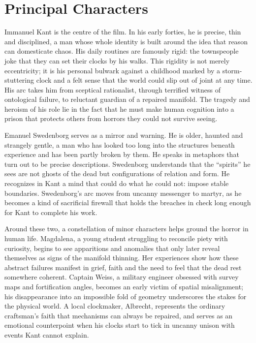 \documentclass[12pt]{article}
\begin{document}
\section*{Principal Characters}

Immanuel Kant is the centre of the film. In his early forties, he is precise, thin and disciplined, a man whose whole identity is built around the idea that reason can domesticate chaos. His daily routines are famously rigid: the townspeople joke that they can set their clocks by his walks. This rigidity is not merely eccentricity; it is his personal bulwark against a childhood marked by a storm-stuttering clock and a felt sense that the world could slip out of joint at any time. His arc takes him from sceptical rationalist, through terrified witness of ontological failure, to reluctant guardian of a repaired manifold. The tragedy and heroism of his role lie in the fact that he must make human cognition into a prison that protects others from horrors they could not survive seeing.

Emanuel Swedenborg serves as a mirror and warning. He is older, haunted and strangely gentle, a man who has looked too long into the structures beneath experience and has been partly broken by them. He speaks in metaphors that turn out to be precise descriptions. Swedenborg understands that the “spirits” he sees are not ghosts of the dead but configurations of relation and form. He recognizes in Kant a mind that could do what he could not: impose stable boundaries. Swedenborg’s arc moves from uncanny messenger to martyr, as he becomes a kind of sacrificial firewall that holds the breaches in check long enough for Kant to complete his work.

Around these two, a constellation of minor characters helps ground the horror in human life. Magdalena, a young student struggling to reconcile piety with curiosity, begins to see apparitions and anomalies that only later reveal themselves as signs of the manifold thinning. Her experiences show how these abstract failures manifest in grief, faith and the need to feel that the dead rest somewhere coherent. Captain Weiss, a military engineer obsessed with survey maps and fortification angles, becomes an early victim of spatial misalignment; his disappearance into an impossible fold of geometry underscores the stakes for the physical world. A local clockmaker, Albrecht, represents the ordinary craftsman’s faith that mechanisms can always be repaired, and serves as an emotional counterpoint when his clocks start to tick in uncanny unison with events Kant cannot explain.
\end{document}
